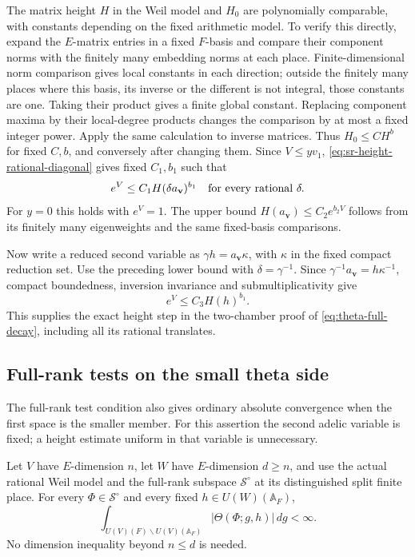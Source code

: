The matrix height \(H\) in the Weil model and \(H_0\)
are polynomially comparable, with constants depending
on the fixed arithmetic model. To verify this directly,
expand the \(E\)-matrix entries in a fixed \(F\)-basis
and compare their component norms with the finitely
many embedding norms at each place.
Finite-dimensional norm comparison gives local
constants in each direction; outside the finitely
many places where this basis, its inverse or the
different is not integral, those constants are one.
Taking their product gives a finite global constant.
Replacing component maxima by their local-degree
products changes the comparison by at most a fixed
integer power. Apply the same calculation to inverse
matrices. Thus \(H_0\le C H^b\) for fixed \(C,b\),
and conversely after changing them.
Since \(V\le yv_1\), \eqref{eq:sr-height-rational-diagonal}
gives fixed \(C_1,b_1\) such that
\[
      e^V\le C_1 H(\delta a_{\mathbf v})^{b_1}
                                  \quad\hbox{for every rational }\delta.
\]
For \(y=0\) this holds with \(e^V=1\).
The upper bound \(H(a_{\mathbf v})\le C_2e^{b_2V}\)
follows from its finitely many eigenweights and the
same fixed-basis comparisons.

Now write a reduced second variable as
\(\gamma h=a_{\mathbf v}\kappa\), with \(\kappa\)
in the fixed compact reduction set.
Use the preceding lower bound with
\(\delta=\gamma^{-1}\).
Since \(\gamma^{-1}a_{\mathbf v}=h\kappa^{-1}\),
compact boundedness, inversion invariance and
submultiplicativity give
\begin{equation}\label{eq:sr-height-second-variable}
             e^V\le C_3H(h)^{b_1}.
\end{equation}
This supplies the exact height step in the
two-chamber proof of
\eqref{eq:theta-full-decay}, including all its
rational translates.



\subsection{Full-rank tests on the small theta side}
\label{subsec:sr-small-theta-ordinary-convergence}

The full-rank test condition also gives ordinary absolute
convergence when the first space is the smaller member.
For this assertion the second adelic variable is fixed;
a height estimate uniform in that variable is unnecessary.

Let \(V\) have \(E\)-dimension \(n\), let \(W\) have
\(E\)-dimension \(d\ge n\), and use the actual rational
Weil model and the full-rank subspace \(\mathcal S^\circ\)
at its distinguished split finite place. For every
\(\Phi\in\mathcal S^\circ\) and every fixed
\(h\in U(W)(\mathbb A_F)\),
\begin{equation}\label{eq:sr-small-theta-absolute}
 \int_{U(V)(F)\backslash U(V)(\mathbb A_F)}
             |\Theta(\Phi;g,h)|\,dg<\infty .
\end{equation}
No dimension inequality beyond \(n\le d\) is needed.

